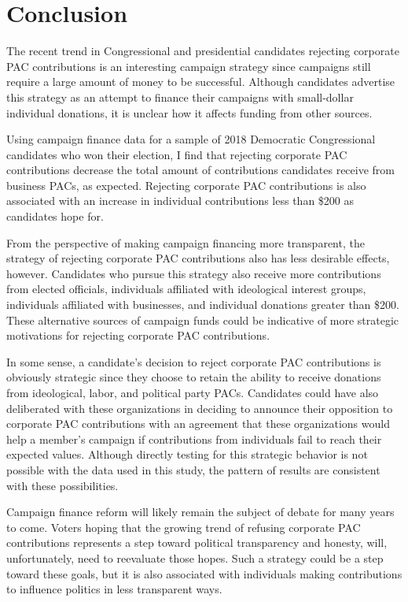 \documentclass[12pt]{article}
\begin{document}
\section{Conclusion} \label{sec: conclusion}

The recent trend in Congressional and presidential candidates rejecting corporate PAC contributions is an interesting campaign strategy since campaigns still require a large amount of money to be successful. Although candidates advertise this strategy as an attempt to finance their campaigns with small-dollar individual donations, it is unclear how it affects funding from other sources. 

Using campaign finance data for a sample of 2018 Democratic Congressional candidates who won their election, I find that rejecting corporate PAC contributions decrease the total amount of contributions candidates receive from business PACs, as expected. Rejecting corporate PAC contributions is also associated with an increase in individual contributions less than \$200 as candidates hope for. 

From the perspective of making campaign financing more transparent, the strategy of rejecting corporate PAC contributions also has less desirable effects, however. Candidates who pursue this strategy also receive more contributions from elected officials, individuals affiliated with ideological interest groups, individuals affiliated with businesses, and individual donations greater than \$200. These alternative sources of campaign funds could be indicative of more strategic motivations for rejecting corporate PAC contributions. 

 In some sense, a candidate's decision to reject corporate PAC contributions is obviously strategic since they choose to retain the ability to receive donations from ideological, labor, and political party PACs. Candidates could have also deliberated with these organizations in deciding to announce their opposition to corporate PAC contributions with an agreement that these organizations would help a member's campaign if contributions from individuals fail to reach their expected values. Although directly testing for this strategic behavior is not possible with the data used in this study, the pattern of results are consistent with these possibilities.
 
 Campaign finance reform will likely remain the subject of debate for many years to come. Voters hoping that the growing trend of refusing corporate PAC contributions represents a step toward political transparency and honesty, will, unfortunately, need to reevaluate those hopes. Such a strategy could be a step toward these goals, but it is also associated with individuals making contributions to influence politics in less transparent ways. 
\end{document}
